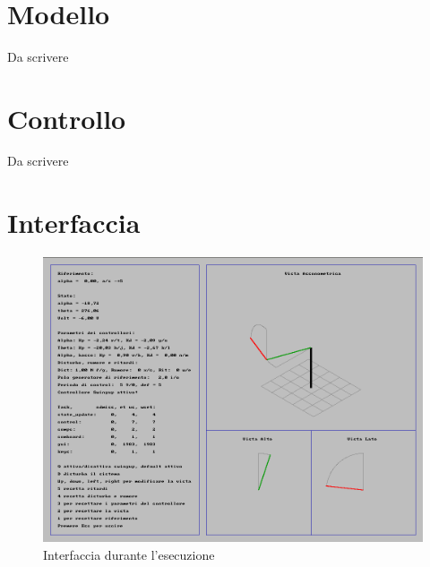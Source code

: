 \begin{math}
\end{math}


\section{Modello}
Da scrivere

\section{Controllo}
Da scrivere

\section{Interfaccia}
\begin{figure}
	\centering
	\includegraphics[height=.4\textheight]{interfaccia_in_esecuzione.png}
	\caption{Interfaccia durante l'esecuzione}
	\label{fig:interfaccia_in_esecuzione}
\end{figure}


